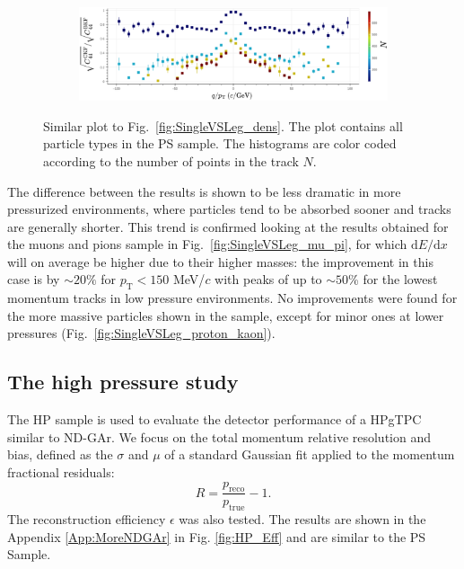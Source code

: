 \begin{figure}[!ht]
     \centering
     \begin{subfigure}[h!]{0.99\textwidth}
         \centering
         \includegraphics[width=\textwidth]{figures/ch5-KF_NDGAr/ToySample/ParScan/TotVSLegVSNPoints_label.eps}
         \caption{}
         \label{fig:SingleVSLeg_NPoints}
     \end{subfigure}
        \caption{Similar plot to Fig.~\ref{fig:SingleVSLeg_dens}. The plot contains all particle types in the PS sample. The histograms are color coded according to the number of points in the track $N$.}
        \label{fig:SingleVSLeg_NPointsAll}
\end{figure}

The difference between the results is shown to be less dramatic in more pressurized environments, where particles tend to be absorbed sooner and tracks are generally shorter. This trend is confirmed looking at the results obtained for the muons and pions sample in Fig.~\ref{fig:SingleVSLeg_mu_pi}, for which $\textrm{d}E/\textrm{d}x$ will on average be higher due to their higher masses: the improvement in this case is by $\sim 20\%$ for $p_{\text{T}}<150$ MeV/$c$ with peaks of up to $\sim50$\% for the lowest momentum tracks in low pressure environments. No improvements were found for the more massive particles shown in the sample, except for minor ones at lower pressures (Fig.~\ref{fig:SingleVSLeg_proton_kaon}). 
\subsection{The high pressure study}
\label{Sec:HPSample}
The HP sample is used to evaluate the detector performance of a HPgTPC similar to ND-GAr. We focus on the total momentum relative resolution and bias, defined as the $\sigma$ and $\mu$ of a standard Gaussian fit applied to the momentum fractional residuals:
\begin{equation}
    R = \frac{p_{\text{reco}}}{p_{\text{true}}} - 1.
\end{equation}
The reconstruction efficiency $\epsilon$ was also tested. The results are shown in the Appendix \ref{App:MoreNDGAr} in Fig. \ref{fig:HP_Eff} and are similar to the PS Sample.

